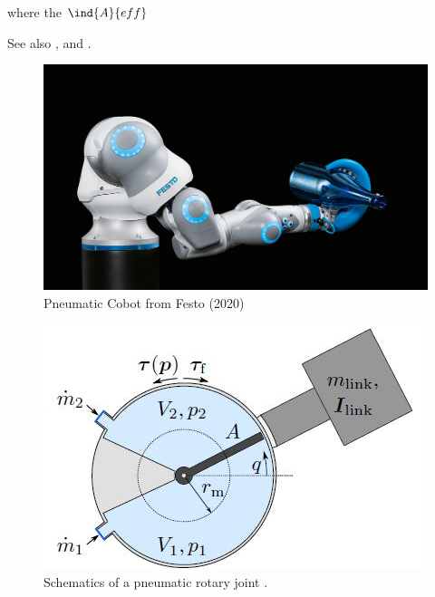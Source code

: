 \documentclass[conference]{IEEEtran}
\newcommand{\Aeff}{\ind{A}{eff} }
\begin{document}
where the $\Aeff$ 

See also \cite{HoffmannIFAC23}, and  \cite{Hoffmann2023}.

\begin{figure}[htbp]
\centerline{\includegraphics[width=\columnwidth]{./pictures/octopusgripper.jpg}}
\caption{Pneumatic Cobot from Festo (2020)}
\label{fig:Octopus}
\end{figure}


\begin{figure}[htbp]
\centerline{\includegraphics[width=\columnwidth]{./pictures/pJoint.jpg}}
\caption{Schematics of a pneumatic rotary joint \cite{HoffmannIFAC23}.}
\label{fig:pJointScheme}
\end{figure}
\end{document}
